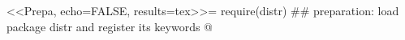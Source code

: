 <<Prepa, echo=FALSE, results=tex>>=
require(distr)
## preparation: load package distr and register its keywords
@
